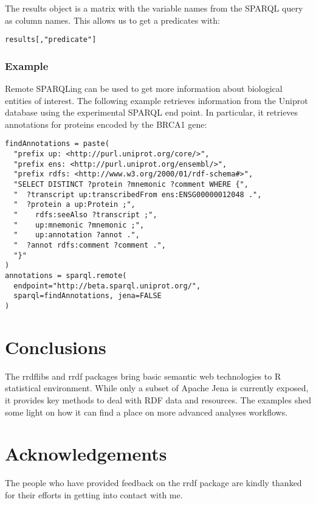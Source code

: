 \documentclass[12pt]{article}
\begin{document}
The results object is a matrix with the variable names from the SPARQL query as column names.
This allows us to get a predicates with:

\begin{footnotesize}
\begin{verbatim}
results[,"predicate"]
\end{verbatim}
\end{footnotesize}

\subsubsection{Example}

Remote SPARQLing can be used to get more information about biological entities of interest. The following
example retrieves information from the Uniprot database using the experimental SPARQL end point. In
particular, it retrieves annotations for proteins encoded by the BRCA1 gene:

\begin{footnotesize}
\begin{verbatim}
findAnnotations = paste(
  "prefix up: <http://purl.uniprot.org/core/>",
  "prefix ens: <http://purl.uniprot.org/ensembl/>",
  "prefix rdfs: <http://www.w3.org/2000/01/rdf-schema#>",
  "SELECT DISTINCT ?protein ?mnemonic ?comment WHERE {",
  "  ?transcript up:transcribedFrom ens:ENSG00000012048 .",
  "  ?protein a up:Protein ;",
  "    rdfs:seeAlso ?transcript ;",
  "    up:mnemonic ?mnemonic ;",
  "    up:annotation ?annot .",
  "  ?annot rdfs:comment ?comment .",
  "}"
)
annotations = sparql.remote(
  endpoint="http://beta.sparql.uniprot.org/",
  sparql=findAnnotations, jena=FALSE
)
\end{verbatim}
\end{footnotesize}

\section{Conclusions}

The rrdflibs and rrdf packages bring basic semantic web technologies to R statistical environment.
While only a subset of Apache Jena is currently exposed, it provides key methods to deal with
RDF data and resources. The examples shed some light on how it can find a place on more advanced
analyses workflows.

\section{Acknowledgements}

The people who have provided feedback on the rrdf package are kindly thanked for their efforts in
getting into contact with me.

\printbibliography
\end{document}
